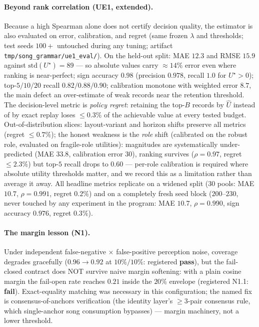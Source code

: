 \documentclass{article}
\begin{document}
\paragraph{Beyond rank correlation (UE1, extended).} Because a high
Spearman alone does not certify decision quality, the estimator is
also evaluated on error, calibration, and regret (same frozen
$\lambda$ and thresholds; test seeds $100+$ untouched during any
tuning; artifact \texttt{tmp/song\_grammar/ue1\_eval/}). On the
held-out split: MAE $12.3$ and RMSE $15.9$ against
$\mathrm{std}(U^\star){=}89$ --- so absolute values carry
${\approx}14\%$ error even where ranking is near-perfect; sign
accuracy $0.98$ (precision $0.978$, recall $1.0$ for $U^\star{>}0$);
top-$5/10/20$ recall $0.82/0.88/0.90$; calibration monotone with
weighted error $8.7$, the main defect an over-estimate of weak
records near the retention threshold. The decision-level metric is
\emph{policy regret}: retaining the top-$B$ records by $\widehat U$
instead of by exact replay loses $\le 0.3\%$ of the achievable value
at every tested budget. Out-of-distribution slices: layout-variant
and horizon shifts preserve all metrics (regret $\le 0.7\%$);
the honest weakness is the \emph{role} shift (calibrated on the
robust role, evaluated on fragile-role utilities): magnitudes are
systematically under-predicted (MAE $33.8$, calibration error $30$),
ranking survives ($\rho{=}0.97$, regret $\le 2.3\%$) but top-$5$
recall drops to $0.60$ --- per-role calibration is required where
absolute utility thresholds matter, and we record this as a
limitation rather than average it away. All headline metrics
replicate on a widened split ($30$ pools: MAE $10.7$, $\rho{=}0.991$,
regret $0.2\%$) and on a completely fresh seed block ($200$--$230$,
never touched by any experiment in the program: MAE $10.7$,
$\rho{=}0.990$, sign accuracy $0.976$, regret $0.3\%$).

\paragraph{The margin lesson (N1).} Under independent false-negative
$\times$ false-positive perception noise, coverage degrades
gracefully ($0.96 \to 0.92$ at $10\%/10\%$: registered
\textbf{pass}), but the fail-closed contract does NOT survive naive
margin softening: with a plain cosine margin the fail-open rate
reaches $0.21$ inside the $20\%$ envelope (registered N1.1:
\textbf{fail}). Exact-equality matching was necessary in this configuration; the named
fix is consensus-of-anchors verification (the identity layer's
$\ge 3$-pair consensus rule, which single-anchor song consumption
bypasses) --- margin machinery, not a lower threshold.
\end{document}
